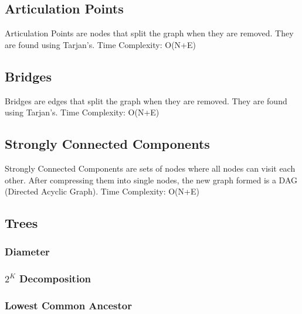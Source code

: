 \documentclass{article}
\begin{document}
\subsection{Articulation Points}
\begin{flushleft}
Articulation Points are nodes that split the graph when they are removed.
They are found using Tarjan's.
\newline
Time Complexity: O(N+E)
\end{flushleft}


\subsection{Bridges}
\begin{flushleft}
Bridges are edges that split the graph when they are removed.
They are found using Tarjan's.
\newline
Time Complexity: O(N+E)
\end{flushleft}


\subsection{Strongly Connected Components}
\begin{flushleft}
Strongly Connected Components are sets of nodes where all nodes can
visit each other. After compressing them into single nodes, the new graph
formed is a DAG (Directed Acyclic Graph).
\newline
Time Complexity: O(N+E)
\end{flushleft}


\subsection{Trees}
\subsubsection{Diameter}

\subsubsection{$2^{K}$ Decomposition}

\subsubsection{Lowest Common Ancestor}

\end{document}
